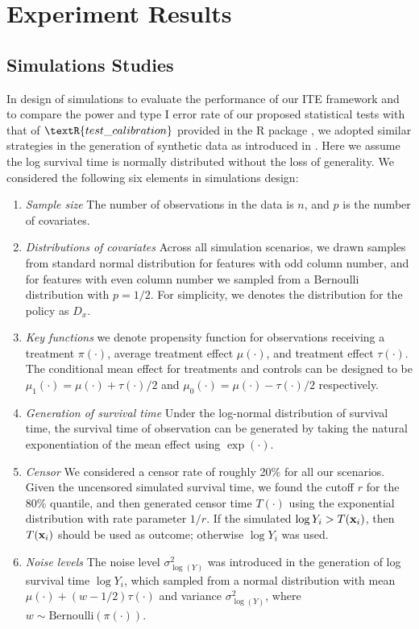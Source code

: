 \section{Experiment Results}
\label{sec:ite_res}

  \subsection{Simulations Studies}
    In design of simulations to evaluate the performance of our ITE framework and to compare the power and type I error rate of our proposed statistical tests with that of $\textR{test\_calibration}$ provided in the R package , we adopted similar strategies in the generation of synthetic data as introduced in \cite{powers2017some}. Here we assume the log survival time is normally distributed without the loss of generality. We considered the following six elements in simulations design:
    \begin{enumerate}
      \item \textit{Sample size} The number of observations in the data is $n$, and $p$ is the number of covariates.
      \item \textit{Distributions of covariates} Across all simulation scenarios, we drawn samples from standard normal distribution for features with odd column number, and for features with even column number we sampled from a Bernoulli distribution with $p = 1/2$. For simplicity, we denotes the distribution for the policy as $D_x$.
      \item \textit{Key functions} we denote propensity function for observations receiving a treatment $\pi(\cdot)$, average treatment effect $\mu(\cdot)$, and treatment effect $\tau(\cdot)$. The conditional mean effect for treatments and controls can be designed to be $\mu_1(\cdot) = \mu(\cdot) + \tau(\cdot)/2 $ and $\mu_0(\cdot) = \mu(\cdot) - \tau(\cdot)/2 $ respectively.
      \item \textit{Generation of survival time} Under the log-normal distribution of survival time, the survival time of observation can be generated by taking the natural exponentiation of the mean effect using $\exp(\cdot)$.
      \item \textit{Censor} We considered a censor rate of roughly 20\% for all our scenarios. Given the uncensored simulated survival time, we found the cutoff $r$ for the 80\% quantile, and then generated censor time $T(\cdot)$ using the exponential distribution with rate parameter $1/r$. If the simulated $\log Y_i > T(\mathbf{x}_i)$, then $T(\mathbf{x}_i)$ should be used as outcome; otherwise $\log Y_i$ was used.
      \item \textit{Noise levels} The noise level $\sigma_{\log(Y)}^2$ was introduced in the generation of log survival time $\log Y_i$, which sampled from a normal distribution with mean $\mu(\cdot) + (w - 1/2) \tau(\cdot)$ and variance $\sigma_{\log(Y)}^2$, where $w \sim \mathrm{Bernoulli}(\pi(\cdot))$. 
    \end{enumerate}  
